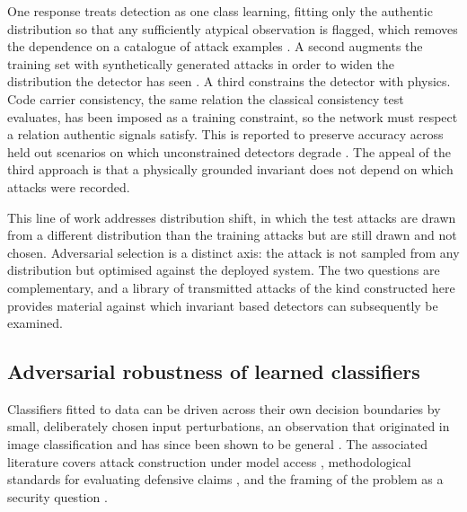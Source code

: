 \documentclass[pdflatex,sn-basic]{sn-jnl}
\theoremstyle{thmstyleone}
\theoremstyle{thmstyletwo}
\theoremstyle{thmstylethree}
\begin{document}
One response treats detection as one class learning, fitting only the authentic
distribution so that any sufficiently atypical observation is flagged, which removes the
dependence on a catalogue of attack examples \citep{iqbal2024deep}. A second augments the
training set with synthetically generated attacks in order to widen the distribution the
detector has seen \citep{chen2025cgan}. A third constrains the detector with physics.
Code carrier consistency, the same relation the classical consistency test evaluates, has
been imposed as a training constraint, so the network must respect a relation authentic
signals satisfy. This is reported to preserve accuracy across held out scenarios on which
unconstrained detectors degrade \citep{song2026generalized}.
The appeal of the third approach is that a physically grounded invariant does not depend
on which attacks were recorded.

This line of work addresses distribution shift, in which the test attacks are drawn from a
different distribution than the training attacks but are still drawn and not chosen.
Adversarial selection is a distinct axis: the attack is not sampled from any distribution
but optimised against the deployed system. The two questions are complementary, and a
library of transmitted attacks of the kind constructed here provides material against
which invariant based detectors can subsequently be examined.

\subsection{Adversarial robustness of learned classifiers}
\label{sec:rw_adversarial}

Classifiers fitted to data can be driven across their own decision boundaries by small,
deliberately chosen input perturbations, an observation that originated in image
classification and has since been shown to be general
\citep{szegedy2014intriguing,goodfellow2015explaining}. The associated literature covers
attack construction under model access \citep{madry2018towards}, methodological standards
for evaluating defensive claims \citep{carlini2019evaluating}, and the framing of the
problem as a security question \citep{biggio2018wild}.
\end{document}

